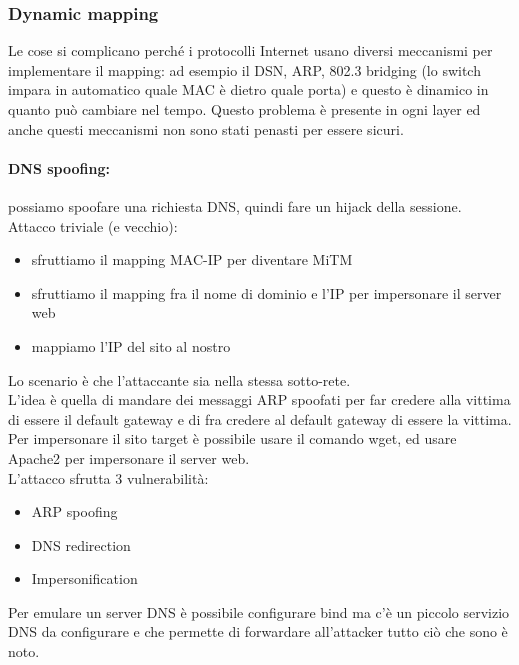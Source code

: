 \documentclass[12pt, oneside]{extbook} %
\begin{document}
\subsubsection{Dynamic mapping}
Le cose si complicano perché i protocolli Internet usano diversi meccanismi per implementare il mapping: ad esempio il DSN, ARP, 802.3 bridging (lo switch impara in automatico quale MAC è dietro quale porta) e questo è dinamico in quanto può cambiare nel tempo. Questo problema è presente in ogni layer ed anche questi meccanismi non sono stati penasti per essere sicuri.
\paragraph{DNS spoofing:}possiamo spoofare una richiesta DNS, quindi fare un hijack della sessione. Attacco triviale (e vecchio):
\begin{itemize}
\item sfruttiamo il mapping MAC-IP per diventare MiTM
\item sfruttiamo il mapping fra il nome di dominio e l'IP per impersonare il server web
\item mappiamo l'IP del sito al nostro
\end{itemize}
Lo scenario è che l'attaccante sia nella stessa sotto-rete.\\ L'idea è quella di mandare dei messaggi ARP spoofati per far credere alla vittima di essere il default gateway e di fra credere al default gateway di essere la vittima.\\ Per impersonare il sito target è possibile usare il comando \textsf{wget}, ed usare Apache2 per impersonare il server web.\\ L'attacco sfrutta 3 vulnerabilità:
\begin{itemize}
\item ARP spoofing
\item DNS redirection
\item Impersonification
\end{itemize}
Per emulare un server DNS è possibile configurare bind ma c'è un piccolo servizio DNS da configurare e che permette di forwardare all'attacker tutto ciò che sono è noto.
\end{document}
